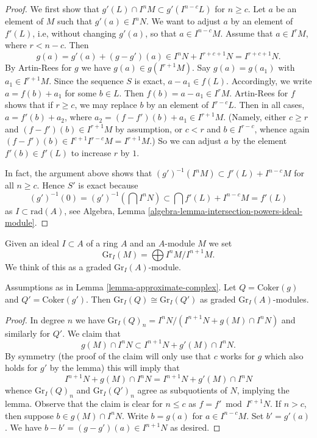 \begin{proof}
We first show that $g'(L) \cap I^nM \subset g'(I^{n - c}L)$ for $n \geq c$.
Let $a$ be an element of $M$ such that $g'(a) \in I^nN$. We want to
adjust $a$ by an element of $f'(L)$, i.e, without changing $g'(a)$, so
that $a \in I^{n-c}M$. Assume that $a \in I^rM$, where $r < n - c$.
Then
$$
g(a) = g'(a) + (g - g')(a) \in
I^n N + I^{r + c + 1}N = I^{r + c + 1}N.
$$
By Artin-Rees for $g$ we have $g(a) \in g(I^{r + 1}M)$. Say $g(a) = g(a_1)$
with $a_1 \in I^{r + 1}M$. Since the sequence $S$ is exact, $a - a_1 \in f(L)$.
Accordingly, we write $a = f(b) + a_1$ for some $b \in L$.
Then $f(b) = a - a_1 \in I^rM$. Artin-Rees for $f$ shows that
if $r \geq c$, we may replace $b$ by an element of $I^{r - c}L$.
Then in all cases, $a = f'(b) + a_2$, where
$a_2 = (f - f')(b) + a_1 \in I^{r + 1}M$. (Namely, either $c \geq r$
and $(f - f')(b) \in I^{r + 1}M$ by assumption, or $c < r$ and
$b \in I^{r - c}$, whence again $(f - f')(b) \in I^{c + 1} I^{r - c} M =
I^{r + 1}M$.) So we can adjust $a$ by the element $f'(b) \in f'(L)$ to
increase $r$ by $1$.

\medskip\noindent
In fact, the argument above shows that
$(g')^{-1}(I^nM) \subset f'(L) + I^{n - c}M$ for all $n \geq c$.
Hence $S'$ is exact because
$$
(g')^{-1}(0) = (g')^{-1}(\bigcap I^nN) \subset
\bigcap f'(L) + I^{n - c}M = f'(L)
$$
as $I \subset \text{rad}(A)$, see Algebra, Lemma
\ref{algebra-lemma-intersection-powers-ideal-module}.
\end{proof}

\noindent
Given an ideal $I \subset A$ of a ring $A$ and an $A$-module $M$
we set
$$
\text{Gr}_I(M) = \bigoplus I^nM/I^{n + 1}M.
$$
We think of this as a graded $\text{Gr}_I(A)$-module.

\begin{lemma}
\label{lemma-approximate-complex-graded}
Assumptions as in Lemma \ref{lemma-approximate-complex}.
Let $Q = \text{Coker}(g)$ and $Q' = \text{Coker}(g')$. Then
$\text{Gr}_I(Q) \cong \text{Gr}_I(Q')$
as graded $\text{Gr}_I(A)$-modules.
\end{lemma}

\begin{proof}
In degree $n$ we have
$\text{Gr}_I(Q)_n = I^nN/(I^{n + 1}N + g(M) \cap I^nN)$
and similarly for $Q'$. We claim that
$$
g(M) \cap I^nN \subset I^{n + 1}N + g'(M) \cap I^nN.
$$
By symmetry (the proof of the claim will only use that $c$ works
for $g$ which also holds for $g'$ by the lemma) this will imply that
$$
I^{n + 1}N + g(M) \cap I^nN = I^{n + 1}N + g'(M) \cap I^nN
$$
whence $\text{Gr}_I(Q)_n$ and $\text{Gr}_I(Q')_n$ agree as subquotients
of $N$, implying the lemma. Observe that the claim is clear for
$n \leq c$ as $f = f' \bmod I^{c + 1}N$. If $n > c$, then suppose
$b \in g(M) \cap I^nN$. Write $b = g(a)$ for $a \in I^{n - c}M$.
Set $b' = g'(a)$. We have $b - b' = (g - g')(a) \in I^{n + 1}N$
as desired.
\end{proof}

